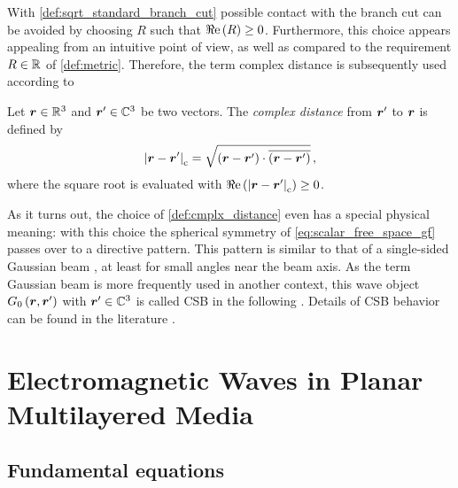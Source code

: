 With \cref{def:sqrt_standard_branch_cut} possible contact with the branch cut
can be avoided by choosing $R$ such that $\Re\mathrm{e}\left(R\right) \geq 0$.
Furthermore, this choice appears appealing from an intuitive point of view,
as well as compared to the requirement $R \in \mathbb{R}$ of \cref{def:metric}.
Therefore, the term complex distance is subsequently used according to
\begin{definition}\label{def:cmplx_distance}
	Let $\robs \in \R^3$ and $\rsrc \in \C^3$ be two vectors.
	The \emph{complex distance} from $\rsrc$ to $\robs$ is defined by
	\begin{equation}
		\cmplxlength{\rdiff} = 
		\sqrt{\left(\rdiff\right) \cdot \overline{\left(\rdiff\right)}}
		\, ,
	\end{equation}
	where the square root is evaluated with
	$\real{\cmplxlength{\rdiff}} \geq 0$.
\end{definition}

As it turns out, the choice of \cref{def:cmplx_distance} even has a special
physical meaning:
with this choice the spherical symmetry of \eqref{eq:scalar_free_space_gf}
passes over to a directive pattern.
This pattern is similar to that of a single-sided Gaussian beam
\cite{hecht2017}, at least for small angles near the beam axis.
As the term Gaussian beam is more frequently used in another context, this
wave object $G_0 \left(\robs, \rsrc\right)$ with $\rsrc \in \C^3$ is called
\ac{CSB} in the following \cite{Hansen2009,Hansen2013}.
Details of \ac{CSB} behavior can be found in the literature
\cite{Deschamps1971,Keller1971,Couture1981}.








\section{Electromagnetic Waves in Planar Multilayered Media}

\subsection{Fundamental equations}
\label{subsec:em_fundamental_equations}

